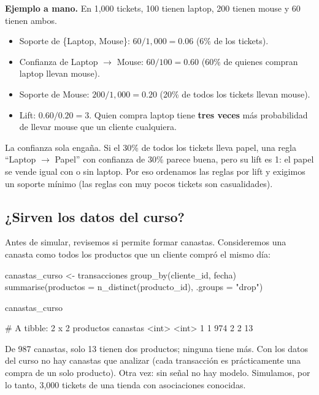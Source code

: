 \textbf{Ejemplo a mano.} En 1{,}000 tickets, 100 tienen laptop, 200 tienen
mouse y 60 tienen ambos.

\begin{itemize}
  \item Soporte de \{Laptop, Mouse\}: $60 / 1{,}000 = 0.06$ (6\% de los tickets).
  \item Confianza de Laptop $\rightarrow$ Mouse: $60 / 100 = 0.60$ (60\% de
        quienes compran laptop llevan mouse).
  \item Soporte de Mouse: $200 / 1{,}000 = 0.20$ (20\% de todos los tickets
        llevan mouse).
  \item Lift: $0.60 / 0.20 = 3$. Quien compra laptop tiene \textbf{tres veces}
        más probabilidad de llevar mouse que un cliente cualquiera.
\end{itemize}

\begin{advertencia}
La confianza sola engaña. Si el 30\% de todos los tickets lleva papel, una
regla ``Laptop $\rightarrow$ Papel'' con confianza de 30\% parece buena, pero
su lift es 1: el papel se vende igual con o sin laptop. Por eso ordenamos las
reglas por lift y exigimos un soporte mínimo (las reglas con muy pocos tickets
son casualidades).
\end{advertencia}

\subsection{¿Sirven los datos del curso?}

Antes de simular, revisemos si  permite formar
canastas. Consideremos una canasta como todos los productos que un cliente
compró el mismo día:

\begin{rcode}
canastas_curso <- transacciones %
  group_by(cliente_id, fecha) %
  summarise(productos = n_distinct(producto_id), .groups = "drop")

canastas_curso %
\end{rcode}

\begin{rsalida}
# A tibble: 2 x 2
  productos canastas
      <int>    <int>
1         1      974
2         2       13
\end{rsalida}

De 987 canastas, solo 13 tienen dos productos; ninguna tiene más. Con los datos
del curso no hay canastas que analizar (cada transacción es prácticamente una
compra de un solo producto). Otra vez: sin señal no hay modelo. Simulamos, por
lo tanto, 3{,}000 tickets de una tienda con asociaciones conocidas.

